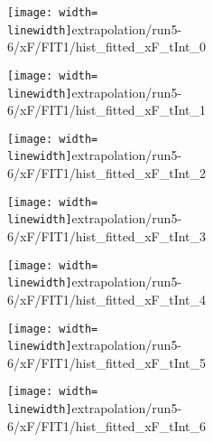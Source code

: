 \begin{figure}
\begin{subfigure}{0.45\linewidth}
\texttt{[image: width=\\linewidth]}{extrapolation/run5-6/xF/FIT1/hist_fitted_xF_tInt_0}
\end{subfigure}
\begin{subfigure}{0.45\linewidth}
\texttt{[image: width=\\linewidth]}{extrapolation/run5-6/xF/FIT1/hist_fitted_xF_tInt_1}
\end{subfigure}
\begin{subfigure}{0.45\linewidth}
\texttt{[image: width=\\linewidth]}{extrapolation/run5-6/xF/FIT1/hist_fitted_xF_tInt_2}
\end{subfigure}
\begin{subfigure}{0.45\linewidth}
\texttt{[image: width=\\linewidth]}{extrapolation/run5-6/xF/FIT1/hist_fitted_xF_tInt_3}
\end{subfigure}
\begin{subfigure}{0.45\linewidth}
\texttt{[image: width=\\linewidth]}{extrapolation/run5-6/xF/FIT1/hist_fitted_xF_tInt_4}
\end{subfigure}
\begin{subfigure}{0.45\linewidth}
\texttt{[image: width=\\linewidth]}{extrapolation/run5-6/xF/FIT1/hist_fitted_xF_tInt_5}
\end{subfigure}
\begin{subfigure}{0.45\linewidth}
\texttt{[image: width=\\linewidth]}{extrapolation/run5-6/xF/FIT1/hist_fitted_xF_tInt_6}
\end{subfigure}
\end{figure}
